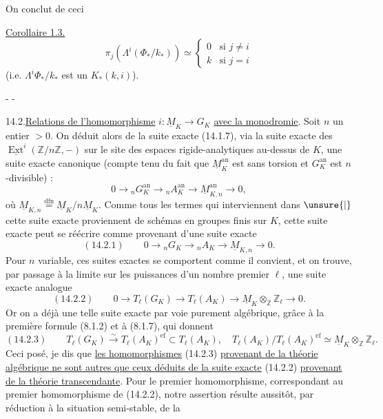On conclut de ceci 

\uline{Corollaire 1.3.}
\[
\pi_j(\Lambda^i(\Phi_*/k_*))\simeq
\begin{cases}0&\text{si }j\ne i\\k&\text{si }j=i\end{cases}
\]
(i.e. $\Lambda^i\Phi_*/k_*$ est un $K_*(k,i)$).

\begin{center}-  -\end{center}
14.2.\quad\uline{Relations de l'homomorphisme} $i:\underline M_K\longrightarrow G_K$
\uline{avec la monodromie}. Soit $n$ un entier $>0$. On déduit alors de la suite exacte (14.1.7), via la
suite exacte des $\underline{\operatorname{Ext}}^i(\mathbb Z/n\mathbb Z,-)$ sur le site des espaces rigide-analytiques
au-dessus de $K$, une suite exacte canonique (compte tenu du fait que
$\underline M_K^{\mathrm{an}}$ est sans torsion et $G_K^{\mathrm{an}}$ est $n$-divisible) :
\[
0\longrightarrow{}_nG_K^{\mathrm{an}}\longrightarrow{}_nA_K^{\mathrm{an}}
\longrightarrow\underline M_{K,n}^{\mathrm{an}}\longrightarrow0,
\]
où $\underline M_{K,n}\overset{\mathrm{dfn}}=\underline M_K/n\underline M_K$.
Comme tous les termes qui interviennent dans $\unsure{\vert}$ cette suite exacte proviennent de schémas en groupes finis sur $K$,
cette suite exacte peut se réécrire comme provenant d'une suite exacte
\[
(14.2.1)\qquad0\longrightarrow{}_nG_K\longrightarrow{}_nA_K
\longrightarrow\underline M_{K,n}\longrightarrow0.
\]
Pour $n$ variable, ces suites exactes se comportent comme il convient,
et on trouve, par passage à la limite sur les puissances d'un nombre premier $\ell$, une suite exacte analogue
\[
(14.2.2)\qquad0\longrightarrow T_\ell(G_K)\longrightarrow T_\ell(A_K)
\longrightarrow\underline M_K\otimes_{\mathbb Z}\mathbb Z_\ell\longrightarrow0.
\]
Or on a déjà une telle suite exacte par voie purement algébrique, grâce
à la première formule (8.1.2) et à (8.1.7), qui donnent
\[
(14.2.3)\qquad T_\ell(G_K)\xrightarrow{\sim}T_\ell(A_K)^{\mathrm{ef}}\subset T_\ell(A_K),
\quad T_\ell(A_K)/T_\ell(A_K)^{\mathrm{ef}}\simeq\underline M_K\otimes_{\mathbb Z}\mathbb Z_\ell.
\]
Ceci posé, je dis que \uline{les homomorphismes} (14.2.3)
\uline{provenant de la théorie algébrique ne sont autres que ceux déduits de la suite exacte} (14.2.2)
\uline{provenant de la théorie transcendante}. Pour le premier homomorphisme,
correspondant au premier homomorphisme de (14.2.2), notre assertion
résulte aussitôt, par réduction à la situation semi-stable, de la

